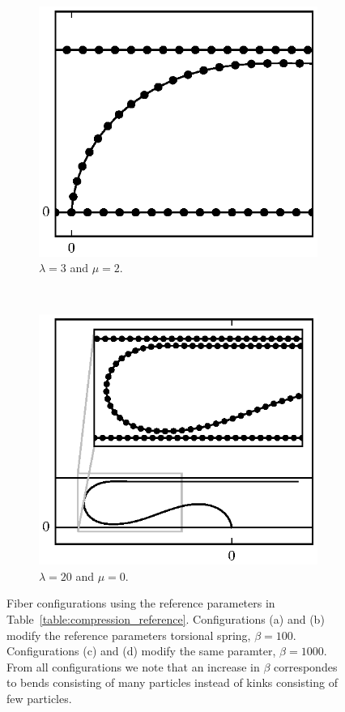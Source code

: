 \begin{figure}
		\begin{subfigure}{.5\textwidth}
			\centering
			\includegraphics{./fig/ch3/push/b1000/l3_m2.eps}
			\caption{$\lambda=3$ and $\mu=2$.\label{subfig:curved}}
		\end{subfigure}%
		~	
		\begin{subfigure}{.5\textwidth}
			\centering
			\includegraphics{./fig/ch3/push/b1000/l20_m0.eps}
			\caption{$\lambda=20$ and $\mu=0$.\label{subfig:long_loop}}
		\end{subfigure}	
		\caption{Fiber configurations using the reference parameters in Table~\ref{table:compression_reference}. Configurations (a) and (b) modify the reference parameters torsional spring, $\beta=100$. Configurations (c) and (d) modify the same paramter, $\beta=1000$. From all configurations we note that an increase in $\beta$ correspondes to bends consisting of many particles instead of kinks consisting of few particles.\label{fig:bending_fiber}}	
	\end{figure}

